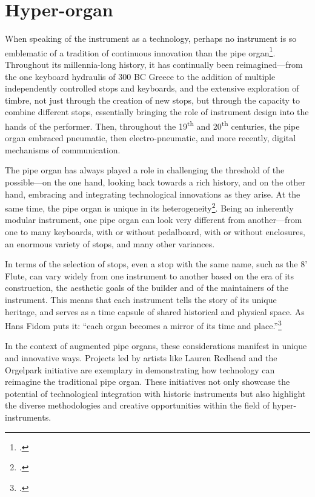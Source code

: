 \documentclass[12pt,twoside,maitrise]{dms_ks}
\theoremstyle{definition}
\begin{document}
{\section{Hyper-organ}

When speaking of the instrument as a technology, perhaps no instrument is so emblematic of a tradition of continuous innovation than the pipe organ\footcite[35]{peters_how_2020}. 
Throughout its millennia-long history, it has continually been reimagined---from the one keyboard hydraulis of 300 BC Greece to the addition of multiple independently controlled stops and keyboards, and the extensive exploration of timbre, not just through the creation of new stops, but through the capacity to combine different stops, essentially bringing the role of instrument design into the hands of the performer. 
Then, throughout the 19\textsuperscript{th} and 20\textsuperscript{th} centuries, the pipe organ embraced pneumatic, then electro-pneumatic, and more recently, digital mechanisms of communication. 

The pipe organ has always played a role in challenging the threshold of the possible---on the one hand, looking back towards a rich history, and on the other hand, embracing and integrating technological innovations as they arise. 
At the same time, the pipe organ is unique in its heterogeneity\footcite[344--345]{redhead_developing_2023}. 
Being an inherently modular instrument, one pipe organ can look very different from another---from one to many keyboards, with or without pedalboard, with or without enclosures, an enormous variety of stops, and many other variances. 

In terms of the selection of stops, even a stop with the same name, such as the 8' Flute, can vary widely from one instrument to another based on the era of its construction, the aesthetic goals of the builder and of the maintainers of the instrument. 
This means that each instrument tells the story of its unique heritage, and serves as a time capsule of shared historical and physical space.
As Hans Fidom puts it: “each organ becomes a mirror of its time and place.”\footcite[18]{fidom_digital_2020}

In the context of augmented pipe organs, these considerations manifest in unique and innovative ways.
Projects led by artists like Lauren Redhead and the Orgelpark initiative are exemplary in demonstrating how technology can reimagine the traditional pipe organ.
These initiatives not only showcase the potential of technological integration with historic instruments but also highlight the diverse methodologies and creative opportunities within the field of hyper-instruments.

}
\end{document}
